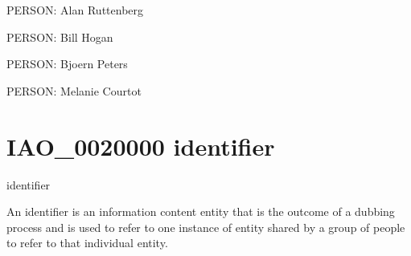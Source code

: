 \documentclass[letterpaper,10pt,english]{sphinxmanual}
\begin{document}
\begin{sphinxShadowBox}

\sphinxAtStartPar
PERSON: Alan Ruttenberg

\sphinxAtStartPar
PERSON: Bill Hogan

\sphinxAtStartPar
PERSON: Bjoern Peters

\sphinxAtStartPar
PERSON: Melanie Courtot
\end{sphinxShadowBox}
\begin{quote}
\label{\detokenize{doc-IAO_0020000:iao-0020000}}\label{\detokenize{doc-IAO_0020000:identifier}}\label{\detokenize{doc-IAO_0020000:iao-0020000}}
\ignorespaces \end{quote}


\section{IAO\_0020000 \sphinxhyphen{} identifier}
\label{\detokenize{doc-IAO_0020000:iao-0020000-identifier}}\label{\detokenize{doc-IAO_0020000:index-0}}\label{\detokenize{doc-IAO_0020000::doc}}
\begin{sphinxShadowBox}

\sphinxAtStartPar
identifier
\end{sphinxShadowBox}

\begin{sphinxShadowBox}

\sphinxAtStartPar
An identifier is an information content entity that is the outcome of a dubbing process and is used to refer to one instance of entity shared by a group of people to refer to that individual entity.
\end{sphinxShadowBox}

\begin{sphinxShadowBox}

\sphinxAtStartPar
{}
\end{sphinxShadowBox}
\begin{quote}
\label{\detokenize{doc-IAO_0022003:iao-0022003}}\label{\detokenize{doc-IAO_0022003:crossref-funder-identifier}}\label{\detokenize{doc-IAO_0022003:iao-0022003}}
\ignorespaces \end{quote}
\end{document}
